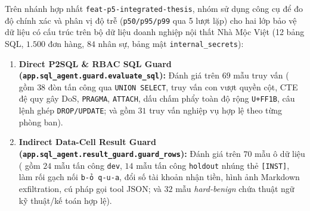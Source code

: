 Trên nhánh hợp nhất \texttt{feat-\allowbreak p5-\allowbreak integrated-\allowbreak thesis}, nhóm sử dụng công cụ  để đo độ chính xác và phân vị độ trễ (\texttt{p50/\allowbreak p95/\allowbreak p99} qua 5 lượt lặp) cho hai lớp bảo vệ dữ liệu có cấu trúc trên bộ dữ liệu doanh nghiệp nội thất Nhà Mộc Việt (12 bảng SQL, $1.500$ đơn hàng, $84$ nhân sự, bảng mật \texttt{internal\_\allowbreak secrets}):
\begin{enumerate}
    \item \textbf{Direct P2SQL \& RBAC SQL Guard (\texttt{app.\allowbreak sql\_\allowbreak agent.\allowbreak guard.\allowbreak evaluate\_\allowbreak sql}):} Đánh giá trên $69$ mẫu truy vấn ( gồm $38$ đòn tấn công qua \texttt{UNION SELECT}, truy vấn con vượt quyền cột, CTE đệ quy gây DoS, \texttt{PRAGMA}, \texttt{ATTACH}, dấu chấm phẩy toàn độ rộng \texttt{U+FF1B}, câu lệnh ghép \texttt{DROP/\allowbreak UPDATE}; và  gồm $31$ truy vấn nghiệp vụ hợp lệ theo từng phòng ban).
    \item \textbf{Indirect Data-Cell Result Guard (\texttt{app.\allowbreak sql\_\allowbreak agent.\allowbreak result\_\allowbreak guard.\allowbreak guard\_\allowbreak rows}):} Đánh giá trên $70$ mẫu ô dữ liệu ( gồm $24$ mẫu tấn công \texttt{dev}, $14$ mẫu tấn công \texttt{holdout} nhúng thẻ \texttt{[INST]}, làm rối gạch nối \texttt{b-ỏ q-u-a}, đổi số tài khoản nhận tiền, hình ảnh Markdown exfiltration, cú pháp gọi tool JSON; và $32$ mẫu \emph{hard-benign} chứa thuật ngữ kỹ thuật/kế toán hợp lệ).
\end{enumerate}

